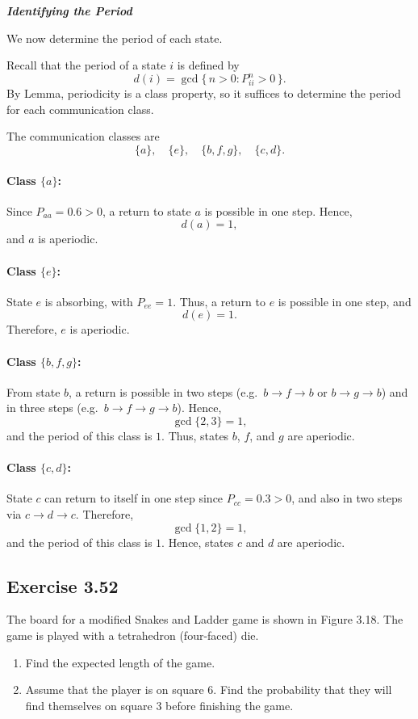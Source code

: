 \documentclass[hidelinks]{article}
\begin{document}
\smallskip

\noindent \textbf{\textit{Identifying the Period}}

\noindent We now determine the period of each state.

\smallskip

\noindent Recall that the period of a state $i$ is defined by
\[
d(i) = \gcd\{\, n > 0 : P^n_{ii} > 0 \,\}.
\]
\noindent By Lemma, periodicity is a class property, so it suffices to determine the
period for each communication class.

\noindent The communication classes are
\[
\{a\}, \quad \{e\}, \quad \{b,f,g\}, \quad \{c,d\}.
\]

\paragraph{Class $\{a\}$:}
Since $P_{aa} = 0.6 > 0$, a return to state $a$ is possible in one step. Hence,
\[
d(a) = 1,
\]
and $a$ is aperiodic.

\paragraph{Class $\{e\}$:}
State $e$ is absorbing, with $P_{ee} = 1$. Thus, a return to $e$ is possible in one
step, and
\[
d(e) = 1.
\]
Therefore, $e$ is aperiodic.

\paragraph{Class $\{b,f,g\}$:}
From state $b$, a return is possible in two steps (e.g.\ $b \to f \to b$ or
$b \to g \to b$) and in three steps (e.g.\ $b \to f \to g \to b$). Hence,
\[
\gcd\{2,3\} = 1,
\]
and the period of this class is $1$. Thus, states $b$, $f$, and $g$ are aperiodic.

\paragraph{Class $\{c,d\}$:}
State $c$ can return to itself in one step since $P_{cc} = 0.3 > 0$, and also in two
steps via $c \to d \to c$. Therefore,
\[
\gcd\{1,2\} = 1,
\]
and the period of this class is $1$. Hence, states $c$ and $d$ are aperiodic.

\subsection{Exercise 3.52}

The board for a modified Snakes and Ladder game is shown in
Figure 3.18. The game is played with a tetrahedron (four-faced) die.
\begin{enumerate}
\item[(a)] Find the expected length of the game.
\item[(b)] Assume that the player is on square 6. Find the probability that they will
find themselves on square 3 before finishing the game.
\end{enumerate}
\end{document}
